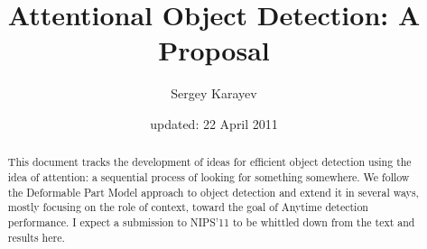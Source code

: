 \documentclass[11pt]{article}
\title{Attentional Object Detection: A Proposal}
\author{Sergey Karayev}
\date{updated: 22 April 2011}
\begin{document}
\maketitle

\begin{abstract}
This document tracks the development of ideas for efficient object detection using the idea of attention: a sequential process of looking for something somewhere.
We follow the Deformable Part Model approach to object detection and extend it in several ways, mostly focusing on the role of context, toward the goal of Anytime detection performance.
I expect a submission to NIPS'11 to be whittled down from the text and results here.
\end{abstract}

\tableofcontents
\newpage










\small

\end{document}
